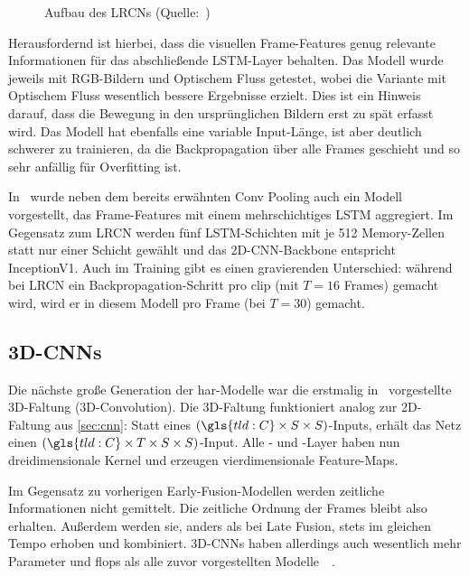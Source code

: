 \begin{figure}[h!]
    \centering
    \caption[Aufbau des LRCNs]{Aufbau des LRCNs (Quelle:~\cite{Donahue14})}
    \label{fig:lrcn}
\end{figure}

Herausfordernd ist hierbei, dass die visuellen Frame-Features genug relevante Informationen für das abschließende LSTM-Layer behalten.
Das Modell wurde jeweils mit RGB-Bildern und Optischem Fluss getestet, wobei die Variante mit Optischem Fluss wesentlich bessere Ergebnisse erzielt.
Dies ist \ua ein Hinweis darauf, dass die Bewegung in den ursprünglichen Bildern erst zu spät erfasst wird.
Das Modell hat ebenfalls eine variable Input-Länge, ist aber deutlich schwerer zu trainieren, da die Backpropagation über alle Frames geschieht und so sehr anfällig für Overfitting ist.

In~\cite{Ng15} wurde neben dem bereits erwähnten Conv Pooling auch ein Modell vorgestellt, das Frame-Features mit einem mehrschichtiges LSTM aggregiert.
Im Gegensatz zum LRCN werden fünf LSTM-Schichten mit je 512 Memory-Zellen statt nur einer Schicht gewählt und das 2D-CNN-Backbone entspricht InceptionV1.
Auch im Training gibt es einen gravierenden Unterschied:
während bei LRCN ein Backpropagation-Schritt pro \gls{clip} (mit $T = 16$ Frames) gemacht wird, wird er in diesem Modell pro Frame (bei $T = 30$) gemacht.

\subsection{3D-CNNs}
\label{subsec:3d-conv}

Die nächste große Generation der \gls{har}-Modelle war die erstmalig in~\cite{Ji13} vorgestellte 3D-Faltung (3D-Convolution).
Die 3D-Faltung funktioniert analog zur 2D-Faltung aus \autoref{sec:cnn}:
Statt eines $(\gls{tld:C} \times S \times S)$-Inputs, erhält das Netz einen $(\gls{tld:C} \times T \times S \times S)$-Input.
Alle \conv- und \pool-Layer haben nun dreidimensionale Kernel und erzeugen vierdimensionale Feature-Maps.

Im Gegensatz zu vorherigen Early-Fusion-Modellen werden zeitliche Informationen nicht gemittelt.
Die zeitliche Ordnung der Frames bleibt also erhalten.
Außerdem werden sie, anders als bei Late Fusion, stets im gleichen Tempo erhoben und kombiniert.
3D-CNNs haben allerdings auch wesentlich mehr Parameter und \gls{flops} als alle zuvor vorgestellten Modelle~\cite{Zhu19}~\cite{Carreira17}.

